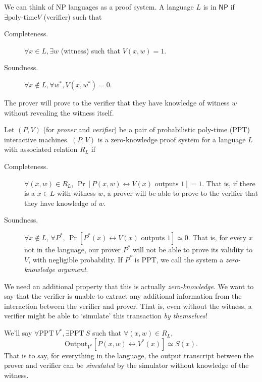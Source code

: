 We can think of NP languages as a proof system. A language $L$ is in $\mathsf{NP}$ if $\exists \text{poly-time} V$ (verifier) such that
\begin{description}
    \item[Completeness.] $\forall x\in L, \exists w$ (witness) such that $V(x, w) = 1$.
    \item[Soundness.] $\forall x\not\in L, \forall w^*, V(x, w^*) = 0$.
\end{description}
The prover will prove to the verifier that they have knowledge of witness $w$ without revealing the witness itself.

\begin{definition}
    Let $(P, V)$ (for \emph{prover} and \emph{verifier}) be a pair of probabilistic poly-time (PPT) interactive machines. $(P, V)$ is a zero-knowledge proof system for a language $L$ with associated relation $R_L$ if
    \begin{description}
        \item[Completeness.] $\forall (x, w)\in R_L$, $\Pr[P(x, w) \leftrightarrow V(x) \text{ outputs }1] = 1$. That is, if there is a $x\in L$ with witness $w$, a prover will be able to prove to the verifier that they have knowledge of $w$.
        \item[Soundness.] $\forall x\not\in L$, $\forall P^*$, $\Pr[P^*(x) \leftrightarrow V(x)\text{ outputs }1]\simeq 0$. That is, for every $x$ not in the language, our prover $P^*$ will not be able to prove its validity to $V$, with negligible probability. If $P^*$ is PPT, we call the system a \emph{zero-knowledge argument}.
    \end{description}
    We need an additional property that this is actually \emph{zero-knowledge}. We want to say that the verifier is unable to extract any additional information from the interaction between the verifier and prover. That is, even without the witness, a verifier might be able to `simulate' this transaction \emph{by themselves}!

    We'll say $\forall \mathrm{PPT}\ V^*, \exists \mathrm{PPT}\ S$ such that $\forall (x, w)\in R_L$,
    \[\mathrm{Output}_{V^*}[P(x, w)\leftrightarrow V^*(x)]\simeq S(x).\]
    That is to say, for everything in the language, the output transcript between the prover and verifier can be \emph{simulated} by the simulator without knowledge of the witness.
\end{definition}

